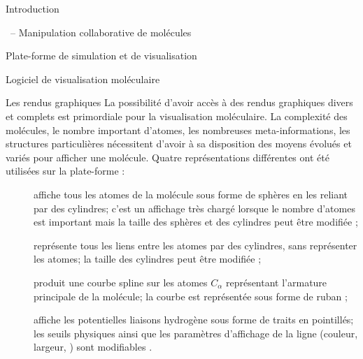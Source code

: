 \documentclass[myfrancais]{mythesis}
\begin{document}
\begin{mypart}{Introduction}
\begin{mychapter}{\myShaddock\ -- Manipulation collaborative de molécules}
\begin{mysection}{Plate-forme de simulation et de visualisation}
\begin{mysubsection}{Logiciel de visualisation moléculaire}
					\begin{mysubsubsection}{Les rendus graphiques}
						La possibilité d'avoir accès à des rendus graphiques divers et complets est primordiale pour la visualisation moléculaire.
						La complexité des molécules, le nombre important d'atomes, les nombreuses meta-informations, les structures particulières nécessitent d'avoir à sa disposition des moyens évolués et variés pour afficher une molécule.
						Quatre représentations différentes  ont été utilisées sur la plate-forme \myShaddock :
						\begin{description}
							\item[\myCPK] affiche tous les atomes de la molécule sous forme de sphères en les reliant par des cylindres; c'est un affichage très chargé lorsque le nombre d'atomes est important mais la taille des sphères et des cylindres peut être modifiée ;
							\item[\myLicorice] représente tous les liens entre les atomes par des cylindres, sans représenter les atomes; la taille des cylindres peut être modifiée ;
							\item[\myNewRibbon] produit une courbe spline sur les atomes $C_{\alpha}$ représentant l'armature principale de la molécule; la courbe est représentée sous forme de ruban ;
							\item[\myHBonds] affiche les potentielles liaisons hydrogène sous forme de traits en pointillés; les seuils physiques ainsi que les paramètres d'affichage de la ligne (couleur, largeur, \myetc) sont modifiables .
						\end{description}


\end{mysubsubsection}
\end{mysubsection}
\end{mysection}
\end{mychapter}
\end{mypart}
\end{document}
